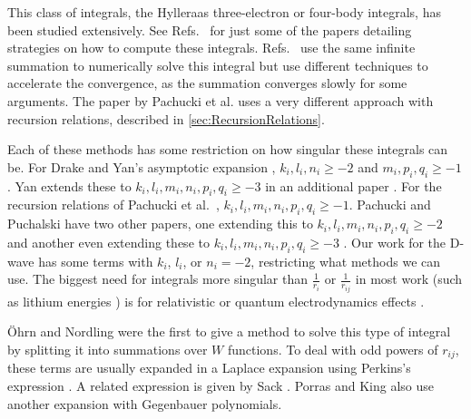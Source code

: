 \documentclass[Dissertation.tex]{subfiles}
\begin{document}
This class of integrals, the Hylleraas three-electron or four-body 
integrals, has been studied extensively. See
Refs.~\cite{Drake1995,Frolov2003,Pelzl1998,Ruiz2009,Pachucki2004} for just some of 
the papers detailing strategies on how to compute these integrals.
Refs.~\cite{Drake1995,Frolov2003,Pelzl1998} use the same infinite summation to numerically solve this 
integral but use different techniques to accelerate the convergence, as the 
summation converges slowly for some arguments. The paper by Pachucki et 
al. \cite{Pachucki2004} uses a very different approach with recursion relations,
described in \cref{sec:RecursionRelations}.

Each of these methods has some restriction on how singular these integrals 
can be. For Drake and Yan's asymptotic expansion \cite{Drake1995,Yan1997},
$k_i, l_i, n_i \geq -2$ and $m_i, p_i, q_i \geq -1$. Yan extends these to
$k_i, l_i, m_i, n_i, p_i, q_i \geq -3$ in an additional paper \cite{Yan2000a}. For 
the recursion relations of Pachucki et al.\ \cite{Pachucki2004},
$k_i, l_i, m_i, n_i, p_i, q_i \geq -1$. Pachucki and Puchalski have two other papers,
one extending this to $k_i, l_i, m_i, n_i, p_i, q_i \geq -2$ \cite{Pachucki2005} 
and another even extending these to $k_i, l_i, m_i, n_i, p_i, q_i \geq -3$ 
\cite{Pachucki2008}. Our work for the D-wave has some terms with $k_i$, $l_i$,
or $n_i = -2$, restricting what methods we can use. The biggest need for 
integrals more singular than $\frac{1}{r_i}$ or $\frac{1}{r_{ij}}$ in most 
work (such as lithium energies \cite{Yan1997a,Puchalski2010}) is for 
relativistic or quantum electrodynamics effects
\cite{Yan1997,Pachucki2008,Puchalski2010}.

{\"O}hrn and Nordling \cite{Ohrn1963} were the first to give a method to 
solve this type of integral by splitting it into summations over $W$ 
functions. To deal with odd powers of $r_{ij}$, these terms are usually 
expanded in a Laplace expansion using Perkins's expression \cite{Perkins1968}.
A related expression is given by Sack \cite{Sack1964}. Porras and King
\cite{Porras1994} also use another expansion with Gegenbauer polynomials.
\end{document}

